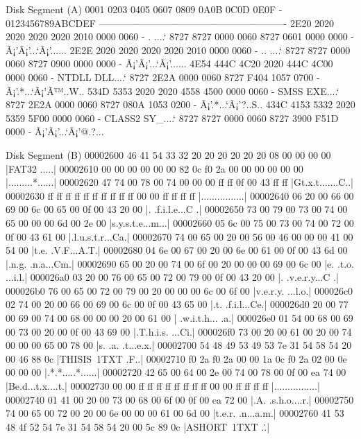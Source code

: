 \documentclass{article}
\begin{document}
    \begin{hexlsting}
        Disk Segment (A)
        0001 0203 0405 0607 0809 0A0B 0C0D 0E0F - 0123456789ABCDEF
        ----------------------------------------------------------
        2E20 2020 2020 2020 2020 2010 0000 0060 - .          ....`
        8727 8727 0000 0060 8727 0601 0000 0000 - Ã¡'Ã¡'...`Ã¡'......
        2E2E 2020 2020 2020 2020 2010 0000 0060 - ..         ....`
        8727 8727 0000 0060 8727 0900 0000 0000 - Ã¡'Ã¡'...`Ã¡'......
        4E54 444C 4C20 2020 444C 4C00 0000 0060 - NTDLL   DLL....`
        8727 2E2A 0000 0060 8727 F404 1057 0700 - Ã¡'.*...`Ã¡'Ã™..W..
        534D 5353 2020 2020 4558 4500 0000 0060 - SMSS    EXE....`
        8727 2E2A 0000 0060 8727 080A 1053 0200 - Ã¡'.*...`Ã¡'?..S..
        434C 4153 5332 2020 5359 5F00 0000 0060 - CLASS2  SY_....`
        8727 8727 0000 0060 8727 3900 F51D 0000 - Ã¡'Ã¡'...`Ã¡'@.?...

        Disk Segment (B)
        00002600  46 41 54 33 32 20 20 20  20 20 20 08 00 00 00 00  |FAT32      .....|
        00002610  00 00 00 00 00 00 82 0c  f0 2a 00 00 00 00 00 00  |.........*......|
        00002620  47 74 00 78 00 74 00 00  00 ff ff 0f 00 43 ff ff  |Gt.x.t.......C..|
        00002630  ff ff ff ff ff ff ff ff  ff ff 00 00 ff ff ff ff  |................|
        00002640  06 20 00 66 00 69 00 6c  00 65 00 0f 00 43 20 00  |. .f.i.l.e...C .|
        00002650  73 00 79 00 73 00 74 00  65 00 00 00 6d 00 2e 00  |s.y.s.t.e...m...|
        00002660  05 6c 00 75 00 73 00 74  00 72 00 0f 00 43 61 00  |.l.u.s.t.r...Ca.|
        00002670  74 00 65 00 20 00 56 00  46 00 00 00 41 00 54 00  |t.e. .V.F...A.T.|
        00002680  04 6e 00 67 00 20 00 6e  00 61 00 0f 00 43 6d 00  |.n.g. .n.a...Cm.|
        00002690  65 00 20 00 74 00 6f 00  20 00 00 00 69 00 6c 00  |e. .t.o. ...i.l.|
        000026a0  03 20 00 76 00 65 00 72  00 79 00 0f 00 43 20 00  |. .v.e.r.y...C .|
        000026b0  76 00 65 00 72 00 79 00  20 00 00 00 6c 00 6f 00  |v.e.r.y. ...l.o.|
        000026c0  02 74 00 20 00 66 00 69  00 6c 00 0f 00 43 65 00  |.t. .f.i.l...Ce.|
        000026d0  20 00 77 00 69 00 74 00  68 00 00 00 20 00 61 00  | .w.i.t.h... .a.|
        000026e0  01 54 00 68 00 69 00 73  00 20 00 0f 00 43 69 00  |.T.h.i.s. ...Ci.|
        000026f0  73 00 20 00 61 00 20 00  74 00 00 00 65 00 78 00  |s. .a. .t...e.x.|
        00002700  54 48 49 53 49 53 7e 31  54 58 54 20 00 46 88 0c  |THISIS~1TXT .F..|
        00002710  f0 2a f0 2a 00 00 1a 0c  f0 2a 02 00 0e 00 00 00  |.*.*.....*......|
        00002720  42 65 00 64 00 2e 00 74  00 78 00 0f 00 ea 74 00  |Be.d...t.x....t.|
        00002730  00 00 ff ff ff ff ff ff  ff ff 00 00 ff ff ff ff  |................|
        00002740  01 41 00 20 00 73 00 68  00 6f 00 0f 00 ea 72 00  |.A. .s.h.o....r.|
        00002750  74 00 65 00 72 00 20 00  6e 00 00 00 61 00 6d 00  |t.e.r. .n...a.m.|
        00002760  41 53 48 4f 52 54 7e 31  54 58 54 20 00 5c 89 0c  |ASHORT~1TXT .\..|


\end{hexlsting}
\end{document}
